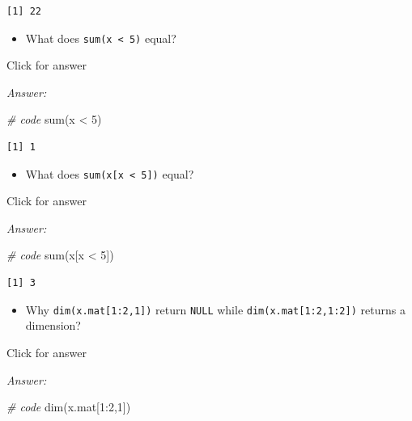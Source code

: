 \documentclass[
]{book}
\newenvironment{Shaded}{\begin{snugshade}}{\end{snugshade}}
\newcommand{\CommentTok}[1]{\textcolor[rgb]{0.56,0.35,0.01}{\textit{#1}}}
\newcommand{\DecValTok}[1]{\textcolor[rgb]{0.00,0.00,0.81}{#1}}
\newcommand{\FunctionTok}[1]{\textcolor[rgb]{0.00,0.00,0.00}{#1}}
\newcommand{\NormalTok}[1]{#1}
\newcommand{\SpecialCharTok}[1]{\textcolor[rgb]{0.00,0.00,0.00}{#1}}
\providecommand{\tightlist}{%
  \setlength{\itemsep}{0pt}\setlength{\parskip}{0pt}}
\begin{document}
\begin{verbatim}
[1] 22
\end{verbatim}

\begin{itemize}
\tightlist
\item
  What does \texttt{sum(x\ \textless{}\ 5)} equal?
\end{itemize}

Click for answer

\emph{Answer:}

\begin{Shaded}
\begin{Highlighting}[]
\CommentTok{\# code}
\FunctionTok{sum}\NormalTok{(x }\SpecialCharTok{\textless{}} \DecValTok{5}\NormalTok{)}
\end{Highlighting}
\end{Shaded}

\begin{verbatim}
[1] 1
\end{verbatim}

\begin{itemize}
\tightlist
\item
  What does \texttt{sum(x{[}x\ \textless{}\ 5{]})} equal?
\end{itemize}

Click for answer

\emph{Answer:}

\begin{Shaded}
\begin{Highlighting}[]
\CommentTok{\# code}
\FunctionTok{sum}\NormalTok{(x[x }\SpecialCharTok{\textless{}} \DecValTok{5}\NormalTok{])}
\end{Highlighting}
\end{Shaded}

\begin{verbatim}
[1] 3
\end{verbatim}

\begin{itemize}
\tightlist
\item
  Why \texttt{dim(x.mat{[}1:2,1{]})} return \texttt{NULL} while \texttt{dim(x.mat{[}1:2,1:2{]})} returns a dimension?
\end{itemize}

Click for answer

\emph{Answer:}

\begin{Shaded}
\begin{Highlighting}[]
\CommentTok{\# code}
\FunctionTok{dim}\NormalTok{(x.mat[}\DecValTok{1}\SpecialCharTok{:}\DecValTok{2}\NormalTok{,}\DecValTok{1}\NormalTok{])}
\end{Highlighting}
\end{Shaded}
\end{document}
